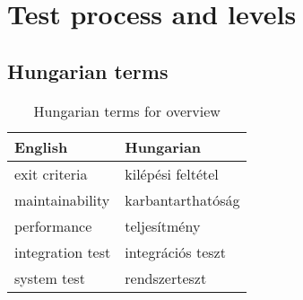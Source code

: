 \chapter{Test process and levels}



\section{Hungarian terms}

\begin{table}
    \centering
    \small
    \caption{Hungarian terms for overview}
    \begin{tabular}{ll}
        \toprule
        \textbf{English} & \textbf{Hungarian} \\
        \midrule
        exit criteria & kilépési feltétel \\
        maintainability & karbantarthatóság \\
        performance & teljesítmény \\
        integration test & integrációs teszt \\
        system test & rendszerteszt \\
        \bottomrule
        \end{tabular}
        \label{tab:overview:hungarian-terms-test-process}
\end{table} 